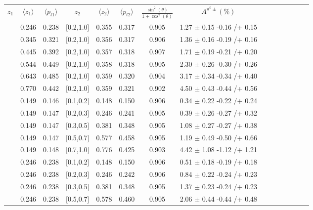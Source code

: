 \begin{table}[H]\scriptsize
\centering
\begin{tabular}{|c| c| c| c| c| c| c| c| c| c|c| c| c| c| c|}
\hline
$z_1$ & $\langle  z_1\rangle$ & $\langle  p_{t1}\rangle$  & $z_2$ & $\langle  z_2 \rangle$ & $\langle  p_{t2}\rangle$ & $\frac{\sin^2(\theta)}{1+\cos^2(\theta)}$& $A^{\pi^0\pm}(\%)$  \\ \hline
[0.2,0.3]	&	0.246	&	0.238	&	[0.2,1.0]	&	0.355	&	0.317	&	0.905	&	1.27	$\pm$	0.15	-0.16	/+	0.15	\\ \hline
[0.3,0.4]	&	0.345	&	0.321	&	[0.2,1.0]	&	0.356	&	0.317	&	0.906	&	1.36	$\pm$	0.16	-0.19	/+	0.16	\\ \hline
[0.4,0.5]	&	0.445	&	0.392	&	[0.2,1.0]	&	0.357	&	0.318	&	0.907	&	1.71	$\pm$	0.19	-0.21	/+	0.20	\\ \hline
[0.5,0.6]	&	0.544	&	0.449	&	[0.2,1.0]	&	0.358	&	0.318	&	0.905	&	2.30	$\pm$	0.26	-0.30	/+	0.26	\\ \hline
[0.6,0.7]	&	0.643	&	0.485	&	[0.2,1.0]	&	0.359	&	0.320	&	0.904	&	3.17	$\pm$	0.34	-0.34	/+	0.40	\\ \hline
[0.7,1.0]	&	0.770	&	0.442	&	[0.2,1.0]	&	0.359	&	0.321	&	0.902	&	4.50	$\pm$	0.43	-0.44	/+	0.56	\\ \hline
[0.1,0.2]	&	0.149	&	0.146	&	[0.1,0.2]	&	0.148	&	0.150	&	0.906	&	0.34	$\pm$	0.22	-0.22	/+	0.24	\\ \hline
[0.1,0.2]	&	0.149	&	0.147	&	[0.2,0.3]	&	0.246	&	0.241	&	0.905	&	0.39	$\pm$	0.26	-0.27	/+	0.32	\\ \hline
[0.1,0.2]	&	0.149	&	0.147	&	[0.3,0.5]	&	0.381	&	0.348	&	0.905	&	1.08	$\pm$	0.27	-0.27	/+	0.38	\\ \hline
[0.1,0.2]	&	0.149	&	0.147	&	[0.5,0.7]	&	0.577	&	0.458	&	0.905	&	1.19	$\pm$	0.49	-0.50	/+	0.66	\\ \hline
[0.1,0.2]	&	0.149	&	0.148	&	[0.7,1.0]	&	0.776	&	0.425	&	0.903	&	4.42	$\pm$	1.08	-1.12	/+	1.21	\\ \hline
[0.2,0.3]	&	0.246	&	0.238	&	[0.1,0.2]	&	0.148	&	0.150	&	0.906	&	0.51	$\pm$	0.18	-0.19	/+	0.18	\\ \hline
[0.2,0.3]	&	0.246	&	0.238	&	[0.2,0.3]	&	0.246	&	0.242	&	0.906	&	0.84	$\pm$	0.22	-0.24	/+	0.23	\\ \hline
[0.2,0.3]	&	0.246	&	0.238	&	[0.3,0.5]	&	0.381	&	0.348	&	0.905	&	1.37	$\pm$	0.23	-0.24	/+	0.23	\\ \hline
[0.2,0.3]	&	0.246	&	0.238	&	[0.5,0.7]	&	0.578	&	0.460	&	0.905	&	2.06	$\pm$	0.44	-0.44	/+	0.48	\\ \hline

\end{tabular}
\end{table}
